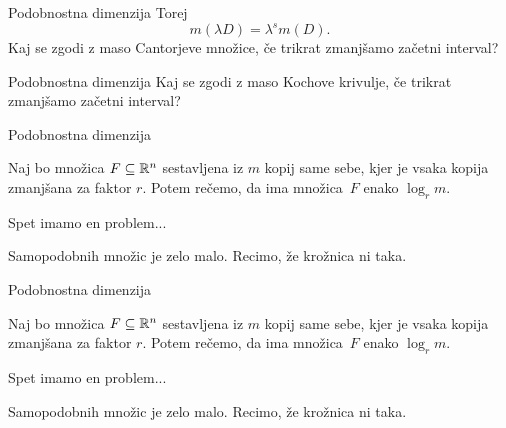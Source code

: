 \documentclass[10pt]{beamer}
\begin{document}
\begin{frame}[t]{Podobnostna dimenzija}
    Torej \[m(\lambda D) = \lambda^s m(D).\]
    Kaj se zgodi z maso Cantorjeve množice, če trikrat zmanjšamo začetni interval?
    \begin{center}
    \end{center}   
    
\end{frame}

\begin{frame}[t]{Podobnostna dimenzija}
    Kaj se zgodi z maso Kochove krivulje, če trikrat zmanjšamo začetni interval?
    \begin{center}
        \drawKoch
    \end{center}       
\end{frame}

\begin{frame}[t]{Podobnostna dimenzija}
    \begin{definicija}
        Naj bo množica \(F \subseteq \mathbb{R}^n\) sestavljena iz \(m\) kopij same sebe, kjer je vsaka kopija zmanjšana za faktor \(r\). Potem rečemo, da ima množica~\(F\)  enako \(\log_r m\).
    \end{definicija}  
    \pause
    Spet imamo en problem... 
    
    \pause
    Samopodobnih množic je zelo malo. Recimo, že krožnica ni taka.

    \begin{center}
        \drawSmile
    \end{center}    
\end{frame}

\begin{frame}[t]{Podobnostna dimenzija}
    \begin{definicija}
        Naj bo množica \(F \subseteq \mathbb{R}^n\) sestavljena iz \(m\) kopij same sebe, kjer je vsaka kopija zmanjšana za faktor \(r\). Potem rečemo, da ima množica~\(F\)  enako \(\log_r m\).
    \end{definicija}  
    Spet imamo en problem... 
    
    Samopodobnih množic je zelo malo. Recimo, že krožnica ni taka.

    \begin{center}
        \drawSmileFunny
    \end{center}    
\end{frame}
\end{document}
